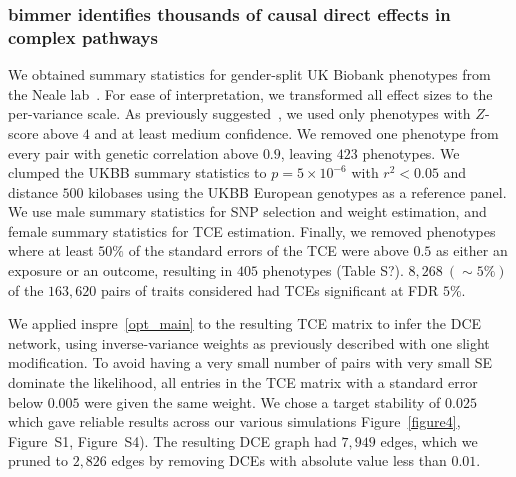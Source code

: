 \documentclass{article}
\begin{document}
\subsubsection*{bimmer identifies thousands of causal direct effects in complex pathways}
We obtained summary statistics for gender-split UK Biobank phenotypes from
the Neale lab~\cite{NealeUKBB}. For ease of interpretation,
we transformed all effect sizes to the per-variance scale. As previously suggested~\cite{BulikSullivan2015,NealeUKBB},
we used only phenotypes with $Z$-score above $4$ and at least medium confidence. We removed one phenotype from every pair with genetic
correlation above $0.9$, leaving $423$ phenotypes. We clumped the UKBB
summary statistics to $p=5 \times 10^{-6}$ with $r^2 < 0.05$ and distance $500$ kilobases using
the UKBB European genotypes as a reference panel. We use male summary statistics for SNP selection
and weight estimation, and female summary statistics for TCE estimation. Finally, we removed
phenotypes where at least $50\%$ of the standard errors of the TCE were above $0.5$
as either an exposure or an outcome, resulting in $405$ phenotypes (Table S?).
$8,268~(\sim 5\%)$ of the $163,620$ pairs of traits considered had TCEs significant at FDR $5\%$.

We applied inspre~\eqref{opt_main} to the resulting TCE matrix to infer the DCE network,
 using inverse-variance weights
as previously described with one slight modification. To avoid having a very small
number of pairs with very small SE dominate the likelihood, all entries in the TCE matrix with
a standard error below $0.005$ were given the same weight.
We chose a target stability of $0.025$ which gave reliable results across our various simulations
Figure~\ref{figure4}, Figure~S1, Figure~S4). The resulting DCE graph had $7,949$ edges,
which we pruned to $2,826$ edges by removing DCEs with absolute value less than $0.01$. 
\end{document}
